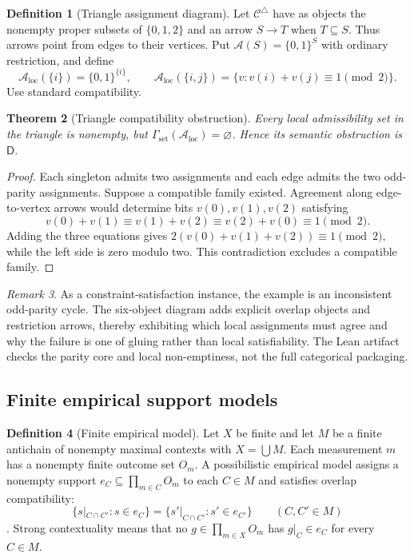 \documentclass[11pt]{article}
\theoremstyle{plain}
\newtheorem{theorem}{Theorem}[section]
\theoremstyle{definition}
\newtheorem{definition}[theorem]{Definition}
\theoremstyle{remark}
\newtheorem{remark}[theorem]{Remark}
\newcommand{\LocalAdm}{\mathcal{A}_{\mathrm{loc}}}
\begin{document}
\begin{definition}[Triangle assignment diagram]\label{def:triangle}
Let $\mathcal C^\triangle$ have as objects the nonempty proper subsets of
$\{0,1,2\}$ and an arrow $S\to T$ when $T\subseteq S$. Thus arrows point from
edges to their vertices. Put $\mathcal A(S)=\{0,1\}^S$ with ordinary
restriction, and define
\[
\LocalAdm(\{i\})=\{0,1\}^{\{i\}},\qquad
\LocalAdm(\{i,j\})=
\{v:v(i)+v(j)\equiv1\pmod2\}.
\]
Use standard compatibility.
\end{definition}

\begin{theorem}[Triangle compatibility obstruction]\label{thm:Dtri}
Every local admissibility set in the triangle is nonempty, but
$\Gamma_{\mathrm{set}}(\LocalAdm)=\varnothing$. Hence its semantic obstruction
is $\mathsf D$.
\end{theorem}

\begin{proof}
Each singleton admits two assignments and each edge admits the two odd-parity
assignments. Suppose a compatible family existed. Agreement along edge-to-vertex
arrows would determine bits $v(0),v(1),v(2)$ satisfying
\[
v(0)+v(1)\equiv v(1)+v(2)\equiv v(2)+v(0)\equiv1\pmod2.
\]
Adding the three equations gives
$2(v(0)+v(1)+v(2))\equiv1\pmod2$, while the left side is zero modulo two. This
contradiction excludes a compatible family.
\end{proof}

\begin{remark}\label{rem:triangle-lean}
As a constraint-satisfaction instance, the example is an inconsistent
odd-parity cycle. The six-object diagram adds explicit overlap objects and
restriction arrows, thereby exhibiting which local assignments must agree and
why the failure is one of gluing rather than local satisfiability. The Lean
artifact checks the parity core and local non-emptiness, not the full categorical
packaging.
\end{remark}

\subsection{Finite empirical support models}

\begin{definition}[Finite empirical model]\label{def:empirical}
Let $X$ be finite and let $M$ be a finite antichain of nonempty maximal
contexts with $X=\bigcup M$. Each measurement $m$ has a nonempty finite outcome set $O_m$.
A possibilistic empirical model assigns a nonempty support
$e_C\subseteq\prod_{m\in C}O_m$ to each $C\in M$ and satisfies overlap
compatibility:
\[
\{s|_{C\cap C'}:s\in e_C\}
=
\{s'|_{C\cap C'}:s'\in e_{C'}\}
\qquad(C,C'\in M)
\]
\cite{abramsky}. Strong contextuality means that no
$g\in\prod_{m\in X}O_m$ has $g|_C\in e_C$ for every $C\in M$.
\end{definition}
\end{document}
